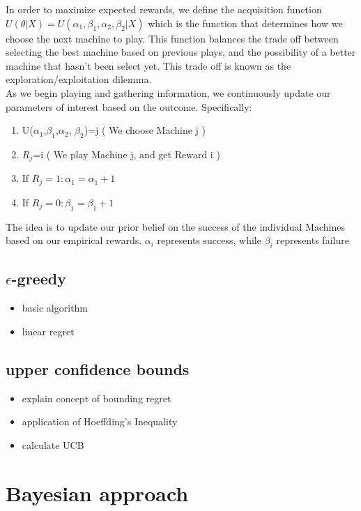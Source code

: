 \documentclass{article}
\begin{document}
In order to maximize expected rewards, we define the acquisition function $U(\theta | X) = U(\alpha_1, \beta_1, \alpha_2, \beta_2 | X)$ which is the function that determines how we choose the next machine to play. This function balances the trade off between selecting the best machine based on previous plays, and the possibility of a better machine that hasn't been select yet. This trade off is known as the exploration/exploitation dilemma.\\

As we begin playing and gathering information, we continuously update our parameters of interest based on the outcome. Specifically:

\begin{enumerate}
\item U($\alpha_1$,$\beta_1$,$\alpha_2$, $\beta_2$)=j  ( We choose Machine j )
\item $R_j$=i  ( We play Machine j, and get Reward i )
\item If $R_j = 1: \alpha_1 = \alpha_1 + 1$
\item If $R_j = 0: \beta_1 = \beta_1 + 1$
\end{enumerate}
The idea is to update our prior belief on the success of the individual Machines based on our empirical rewards. $\alpha_i$ represents success, while $\beta_i$ represents failure


\subsection{$\epsilon$-greedy}

\begin{itemize}
\item  basic algorithm
\item  linear regret
\end{itemize}

\subsection{upper confidence bounds}

\begin{itemize}
\item  explain concept of bounding regret
\item  application of Hoeffding's Inequality
\item  calculate UCB
\end{itemize}

\section{Bayesian approach}
\end{document}

